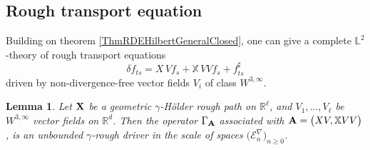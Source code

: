 \documentclass[11pt,a4paper]{amsart}
\newcommand{\RR}{\mathbb{R}}  \newcommand{\CC}{\mathbb{C}}  \newcommand{\LL}{\mathbb{L}}  \newcommand{\WW}{\mathbb{W}}
\newcommand{\mcE}{\mathcal{E}}
\newcommand{\bbX}{\mathbb{X}}
\renewcommand{\geq}{\geqslant}
\newtheorem{lem}[thm]{\hspace{-0.15cm}  {\sc Lemma} }%
\numberwithin{equation}{section} %
\begin{document}
\medskip


\subsection{Rough transport equation}
\label{SubsectionL2Transport}

Building on theorem \ref{ThmRDEHilbertGeneralClosed}, one can give a complete $\LL^2$-theory of rough transport equations 
\begin{equation*}
\delta f_{ts} = X\,Vf_s +  \bbX\,V V f_s + f^\sharp_{ts}
\end{equation*} 
driven by non-divergence-free vector fields $V_i$ of class $W^{3,\infty}$.

\medskip

\begin{lem}
\label{LemmaGammaA}
Let ${\bf X}$ be a geometric $\gamma$-H\"older rough path on $\RR^\ell$, and $V_1,\dots,V_\ell$ be $W^{3,\infty}$ vector fields on $\RR^d$. Then the operator $\Gamma_{\bf A}$ associated with ${\bfA} = \big(XV, \bbX VV\big)$, is an unbounded $\gamma$-rough driver in the scale of spaces $\big(\mcE^\nabla_n\big)_{n\geq 0}$.
\end{lem}
\end{document}
